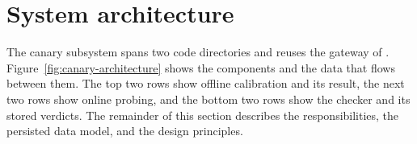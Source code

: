 \section{System architecture}
\label{sec:architecture}

The canary subsystem spans two code directories and reuses the gateway of
\NoesisServer{}. Figure~\ref{fig:canary-architecture} shows the components and
the data that flows between them. The top two rows show offline calibration and
its result, the next two rows show online probing, and the bottom two rows show
the checker and its stored verdicts. The
remainder of this section describes the responsibilities, the persisted data
model, and the design principles.

% 
% 
% 
% 
% 
